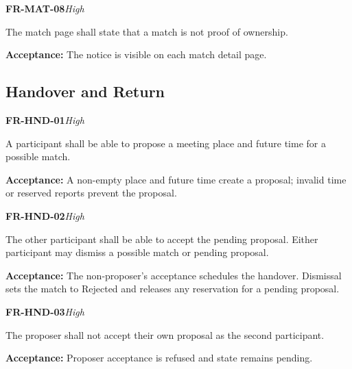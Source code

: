 \documentclass[12pt,a4paper,oneside]{report}
\begin{document}
\noindent\begin{minipage}{\linewidth}\textbf{FR-MAT-08}\hfill\textit{High}\par\nopagebreak

The match page shall state that a match is not proof of ownership.

{\color{muted}\textbf{Acceptance:} The notice is visible on each match detail page.\par}\end{minipage}\par\vspace{5pt}


\subsection{Handover and Return}

\noindent\begin{minipage}{\linewidth}\textbf{FR-HND-01}\hfill\textit{High}\par\nopagebreak

A participant shall be able to propose a meeting place and future time for a possible match.

{\color{muted}\textbf{Acceptance:} A non-empty place and future time create a proposal; invalid time or reserved reports prevent the proposal.\par}\end{minipage}\par\vspace{5pt}

\noindent\begin{minipage}{\linewidth}\textbf{FR-HND-02}\hfill\textit{High}\par\nopagebreak

The other participant shall be able to accept the pending proposal. Either participant may dismiss a possible match or pending proposal.

{\color{muted}\textbf{Acceptance:} The non-proposer's acceptance schedules the handover. Dismissal sets the match to Rejected and releases any reservation for a pending proposal.\par}\end{minipage}\par\vspace{5pt}

\noindent\begin{minipage}{\linewidth}\textbf{FR-HND-03}\hfill\textit{High}\par\nopagebreak

The proposer shall not accept their own proposal as the second participant.

{\color{muted}\textbf{Acceptance:} Proposer acceptance is refused and state remains pending.\par}\end{minipage}\par\vspace{5pt}
\end{document}
